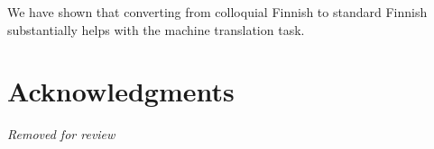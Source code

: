 \documentclass[11pt]{article}
\begin{document}
We have shown that converting from colloquial Finnish to standard Finnish substantially
helps with the machine translation task.


\section*{Acknowledgments}

\textit{Removed for review}



\end{document}
